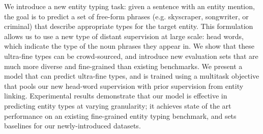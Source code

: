 We introduce a new entity typing task: given a sentence with an entity mention, the goal is to predict a set of free-form phrases (e.g. skyscraper, songwriter, or criminal) that describe appropriate types for the target entity. This formulation allows us to use a new type of distant supervision at large scale: head words, which indicate the type of the noun phrases they appear in. We show that these ultra-fine types can be crowd-sourced, and introduce new evaluation sets that are much more diverse and fine-grained than existing benchmarks. We present a model that can predict ultra-fine types, and is trained using a multitask objective that pools our new head-word supervision with prior supervision from entity linking. Experimental results demonstrate that our model is effective in predicting entity types at varying granularity; it achieves state of the art performance on an existing fine-grained entity typing benchmark, and sets baselines for our newly-introduced datasets.
